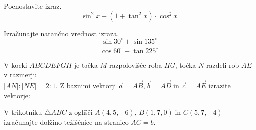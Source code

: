\documentclass[addpoints]{exam}
\begin{document}
\begin{questions}


    \question[3]
    Poenostavite izraz. 
    $$\sin^2x - \left(1 + \tan^2x\right)\cdot\cos^2x$$

    \begin{solution}[6.5cm]
       
    \end{solution}



    \question[4]
    Izračunajte natančno vrednost izraza. 
    $$ \dfrac{\sin{30^\circ}+ \sin{135^\circ}}{\cos{60^\circ} - \tan{225^\circ}}$$

    \begin{solution}[6cm]
       
    \end{solution}


\newpage

    \question
    V kocki $ABCDEFGH$ je točka $M$ razpolovišče roba $HG$, točka $N$ razdeli rob $AE$ v razmerju \\ $|AN|:|NE|=2:1$.
    Z baznimi vektorji $\overrightarrow{a}=\overrightarrow{AB}, \overrightarrow{b}=\overrightarrow{AD}$ in $\overrightarrow{c}=\overrightarrow{AE}$ izrazite vektorje: 

    \begin{solution}[5cm]

    \end{solution}

    

    

    \question[3]
    V trikotniku $\triangle ABC$ z oglišči $A(4,5,-6)$, $B(1,7,0)$ in $C(5,7,-4)$ izračunajte dolžino težiščnice na stranico $AC=b$.


\end{questions}
\end{document}
